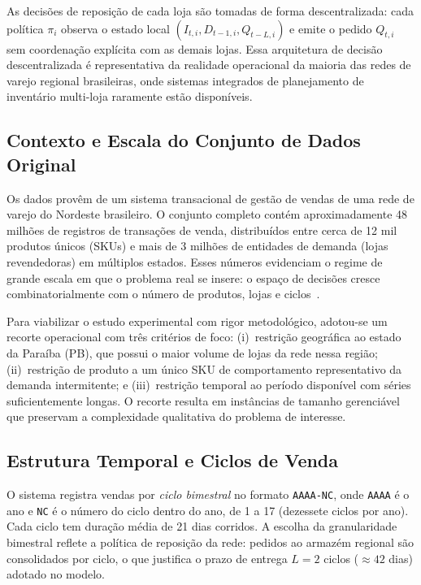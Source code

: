 \documentclass[a4paper,11pt]{article}
\begin{document}
As decisões de reposição de cada loja são tomadas de forma
descentralizada: cada política $\pi_i$ observa o estado local
$(I_{t,i}, D_{t-1,i}, Q_{t-L,i})$ e emite o pedido $Q_{t,i}$ sem
coordenação explícita com as demais lojas. Essa arquitetura de
decisão descentralizada é representativa da realidade operacional
da maioria das redes de varejo regional brasileiras, onde sistemas
integrados de planejamento de inventário multi-loja raramente
estão disponíveis.

\subsection{Contexto e Escala do Conjunto de Dados Original}

Os dados provêm de um sistema transacional de gestão de vendas de
uma rede de varejo do Nordeste brasileiro. O conjunto completo
contém aproximadamente 48 milhões de registros de transações de
venda, distribuídos entre cerca de 12 mil produtos únicos (SKUs) e
mais de 3 milhões de entidades de demanda (lojas revendedoras) em
múltiplos estados. Esses números evidenciam o regime de grande
escala em que o problema real se insere: o espaço de decisões cresce
combinatorialmente com o número de produtos, lojas e
ciclos~\citep{shapiro:2001,boute:2022}.

Para viabilizar o estudo experimental com rigor metodológico,
adotou-se um recorte operacional com três critérios de foco:
(i)~restrição geográfica ao estado da Paraíba (PB), que possui o
maior volume de lojas da rede nessa região; (ii)~restrição de
produto a um único SKU de comportamento representativo da demanda
intermitente; e (iii)~restrição temporal ao período disponível com
séries suficientemente longas. O recorte resulta em instâncias de
tamanho gerenciável que preservam a complexidade qualitativa do
problema de interesse.

\subsection{Estrutura Temporal e Ciclos de Venda}

O sistema registra vendas por \emph{ciclo bimestral} no formato
\texttt{AAAA-NC}, onde \texttt{AAAA} é o ano e \texttt{NC} é o
número do ciclo dentro do ano, de 1 a 17 (dezessete ciclos por
ano). Cada ciclo tem duração média de 21 dias corridos. A escolha da
granularidade bimestral reflete a política de reposição da rede:
pedidos ao armazém regional são consolidados por ciclo, o que
justifica o prazo de entrega $L = 2$ ciclos ($\approx 42$ dias)
adotado no modelo.
\end{document}
